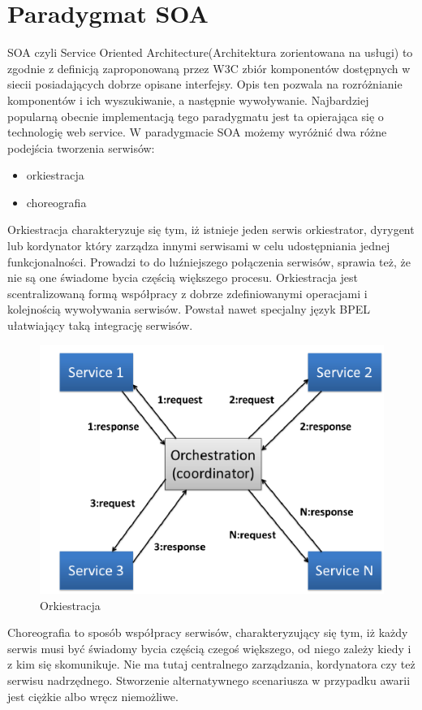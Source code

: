 \section{Paradygmat SOA}
SOA czyli Service Oriented Architecture(Architektura zorientowana na usługi) to zgodnie z definicją zaproponowaną przez W3C zbiór komponentów dostępnych w siecii posiadających dobrze opisane interfejsy. Opis ten pozwala na rozróżnianie komponentów i ich wyszukiwanie, a następnie wywoływanie. Najbardziej popularną obecnie implementacją tego paradygmatu jest ta opierająca się o technologię web service.  W paradygmacie SOA możemy wyróżnić dwa różne podejścia tworzenia serwisów:
 \begin{itemize}
	\item orkiestracja
	\item choreografia
\end{itemize}  
Orkiestracja charakteryzuje się tym, iż istnieje jeden serwis orkiestrator, dyrygent lub kordynator który zarządza innymi serwisami w celu udostępniania jednej funkcjonalności. Prowadzi to do luźniejszego połączenia serwisów, sprawia też, że nie są one świadome bycia częścią większego procesu. Orkiestracja jest scentralizowaną formą współpracy z dobrze zdefiniowanymi operacjami i kolejnością wywoływania serwisów. Powstał nawet specjalny język BPEL ułatwiający taką integrację serwisów.   
\begin{figure}[!h]
	\centering
	\includegraphics[scale=0.75]{orkiestracja.png} 
	\caption{Orkiestracja}
\end{figure}
\newpage
Choreografia to sposób współpracy serwisów, charakteryzujący się tym,  iż każdy serwis musi być świadomy bycia częścią czegoś większego, od niego zależy kiedy i z kim się skomunikuje. Nie ma tutaj centralnego zarządzania, kordynatora czy też serwisu nadrzędnego. Stworzenie alternatywnego scenariusza w przypadku awarii jest ciężkie albo wręcz niemożliwe. 
